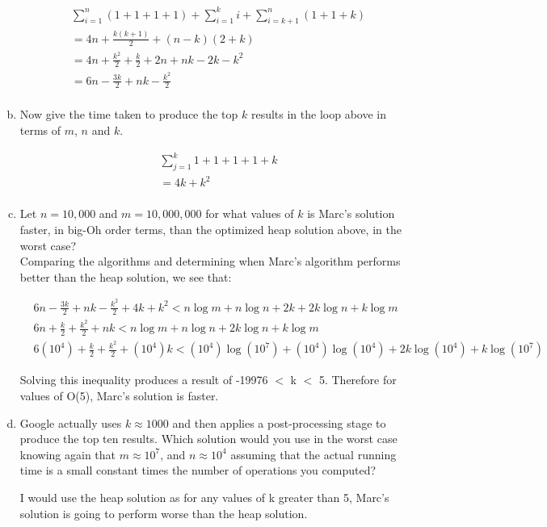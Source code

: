 \documentclass[12pt]{article}
\begin{document}
\begin{enumerate}[(a)]
\begin{align*}
  &\sum_{i=1}^n (1 + 1 + 1 + 1) + \sum_{i=1}^k i + \sum_{i=k+1}^n (1 + 1 + k)\\
  &= 4n + \frac{k(k+1)}{2} + (n-k)(2 + k)\\
  &= 4n + \frac{k^2}{2} + \frac{k}{2} + 2n + nk -2k - k^2\\
  &= 6n - \frac{3k}{2} + nk - \frac{k^2}{2}\\
\end{align*}

\item  Now give the time taken
to produce the top $k$ results in the loop above in terms of $m$, $n$ and $k$.

\begin{align*}
  &\sum_{j=1}^k 1 + 1 + 1 + 1 + k\\
  & = 4k + k^2\\
\end{align*}

\item Let $n=10,000$ and $m=10,000,000$ for what values of $k$ is Marc's solution faster, in big-Oh order terms, than the optimized
heap solution above, in the worst case?\\

Comparing the algorithms and determining when Marc's algorithm performs better than the heap solution, we see that:

\begin{align*}
  &6n - \frac{3k}{2} + nk - \frac{k^2}{2} + 4k + k^2 < n\log m + n\log n + 2k + 2k\log n + k\log m\\
  &6n + \frac{k}{2} + \frac{k^2}{2} + nk < n\log m + n\log n + 2k\log n + k\log m\\
  &6(10^4) + \frac{k}{2} + \frac{k^2}{2} + (10^4)k < (10^4)\log (10^7) + (10^4)\log (10^4) + 2k\log (10^4) + k\log (10^7)
\end{align*}

Solving this inequality produces a result of -19976 $<$ k $<$ 5. Therefore for values of O(5), Marc's solution is faster.

\item Google actually uses $k\approx 1000$ and then applies a post-processing stage to produce the top ten
results. Which solution would you use in the worst case knowing again that $m\approx 10^7$, and $n\approx 10^4$ assuming that the actual
running time is a small constant times the number of operations you computed?

I would use the heap solution as for any values of k greater than 5, Marc's solution is going to perform worse than the heap solution.
\end{enumerate}
\end{document}
